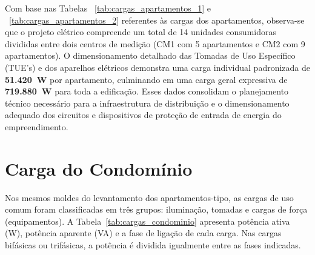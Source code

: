 \documentclass[12pt,openright,oneside,a4paper,brazil]{abntex2}
\begin{document}
Com base nas Tabelas ~\ref{tab:cargas_apartamentos_1} e ~\ref{tab:cargas_apartamentos_2} referentes às cargas dos apartamentos, observa-se que o projeto elétrico compreende um total de 14 unidades consumidoras divididas entre dois centros de medição (CM1 com 5 apartamentos e CM2 com 9 apartamentos). O dimensionamento detalhado das Tomadas de Uso Específico (TUE's) e dos aparelhos elétricos demonstra uma carga individual padronizada de \textbf{51.420~W} por apartamento, culminando em uma carga geral expressiva de \textbf{719.880~W} para toda a edificação. Esses dados consolidam o planejamento técnico necessário para a infraestrutura de distribuição e o dimensionamento adequado dos circuitos e dispositivos de proteção de entrada de energia do empreendimento.

\section{Carga do Condomínio}
\label{subsec:carga_condominio}
\hspace{1.27cm} Nos mesmos moldes do levantamento dos apartamentos-tipo, as cargas de uso comum foram classificadas em três grupos: iluminação, tomadas e cargas de força (equipamentos). A Tabela~\ref{tab:cargas_condominio} apresenta potência ativa (W), potência aparente (VA) e a fase de ligação de cada carga. Nas cargas bifásicas ou trifásicas, a potência é dividida igualmente entre as fases indicadas.
\end{document}
